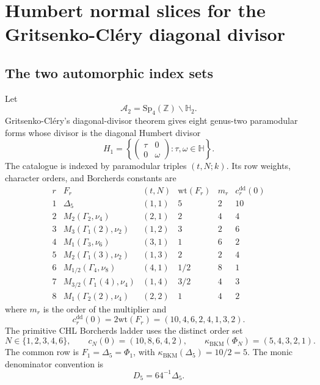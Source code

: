 \providecommand{\cA}{\mathcal{A}}
\providecommand{\cO}{\mathcal{O}}
\providecommand{\paramod}[1]{\Gamma_{#1}}
\providecommand{\paramodlvl}[2]{\Gamma_{#1}(#2)}
\providecommand{\kBKM}{\kappa_{\mathrm{BKM}}}
\providecommand{\kcat}{\kappa_{\mathrm{cat}}}
\providecommand{\kch}{\kappa_{\mathrm{ch}}}
\providecommand{\kfiber}{\kappa_{\mathrm{fiber}}}
\providecommand{\Sp}{\mathrm{Sp}}
\providecommand{\Z}{\mathbb{Z}}
\providecommand{\H}{\mathbb{H}}
\providecommand{\bC}{\mathbb{C}}
\providecommand{\Div}{\mathrm{Div}}
\providecommand{\wt}{\mathrm{wt}}

\section{Humbert normal slices for the Gritsenko-Cl\'ery diagonal divisor}
\label{wn:sec:arnold-boundary-GC}

\subsection*{The two automorphic index sets}

Let
\[
  \cA_2=\Sp_4(\Z)\backslash\H_2 .
\]
Gritsenko-Cl\'ery's diagonal-divisor theorem gives eight genus-two
paramodular forms whose divisor is the diagonal Humbert divisor
\[
  H_1=\left\{
    \begin{pmatrix}\tau&0\\0&\omega\end{pmatrix}
    :\tau,\omega\in\H
  \right\}.
\]
The catalogue is indexed by paramodular triples \((t,N;k)\).  Its row
weights, character orders, and Borcherds constants are
\[
\begin{array}{c|c|c|c|c|c}
r&F_r&(t,N)&\wt(F_r)&m_r&c_r^{\mathrm{dd}}(0)\\ \hline
1&\Delta_5&(1,1)&5&2&10\\
2&M_2(\paramod{2},\nu_4)&(2,1)&2&4&4\\
3&M_3(\paramodlvl{1}{2},\nu_2)&(1,2)&3&2&6\\
4&M_1(\paramod{3},\nu_6)&(3,1)&1&6&2\\
5&M_2(\paramodlvl{1}{3},\nu_2)&(1,3)&2&2&4\\
6&M_{1/2}(\paramod{4},\nu_8)&(4,1)&1/2&8&1\\
7&M_{3/2}(\paramodlvl{1}{4},\nu_4)&(1,4)&3/2&4&3\\
8&M_1(\paramodlvl{2}{2},\nu_4)&(2,2)&1&4&2
\end{array}
\]
where \(m_r\) is the order of the multiplier and
\[
  c_r^{\mathrm{dd}}(0)=2\wt(F_r)=(10,4,6,2,4,1,3,2).
\]
The primitive CHL Borcherds ladder uses the distinct order set
\[
  N\in\{1,2,3,4,6\},\qquad
  c_N(0)=(10,8,6,4,2),\qquad
  \kBKM(\Phi_N)=(5,4,3,2,1).
\]
The common row is \(F_1=\Delta_5=\Phi_1\), with
\(\kBKM(\Delta_5)=10/2=5\).  The monic denominator convention is
\[
  D_5=64^{-1}\Delta_5 .
\]

